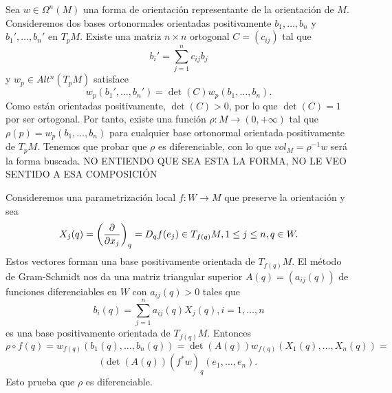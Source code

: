 \documentclass[CV.tex]{subfiles}
\begin{document}
\begin{dem}
Sea $w\in \Omega^n(M)$ una forma de orientación representante de la orientación de $M$. Consideremos dos bases ortonormales orientadas positivamente $b_1,\dots,b_n$ y $b_1',\dots,b_n'$ en $T_pM$. Existe una matriz $n\times n$ ortogonal $C=(c_{ij})$ tal que
\[
b_i'=\sum_{j=1}^n c_{ij}b_j
\]
y $w_p\in Alt^n(T_pM)$ satisface
\[
w_p(b_1',\dots,b_n')=\det(C)w_p(b_1,\dots,b_n).
\]
Como están orientadas positivamente, $\det(C)>0$, por lo que $\det(C)=1$ por ser ortogonal. Por tanto, existe una función $\rho:M\to (0,+\infty)$ tal que $\rho(p)=w_p(b_1,\dots,b_n)$ para cualquier base ortonormal orientada positivamente de $T_pM$. Tenemos que probar que $\rho$ es diferenciable, con lo que $vol_M=\rho^{-1}w$ será la forma buscada. NO ENTIENDO QUE SEA ESTA LA FORMA, NO LE VEO SENTIDO A ESA COMPOSICIÓN

Consideremos una parametrización local $f:W\to M$ que preserve la orientación y sea
\[
X_j(q)=\left(\frac{\partial }{\partial x_j}\right)_q=D_qf(e_j)\in T_{f(q)}M, 1\leq j\leq n, q\in W.
\]
Estos vectores forman una base positivamente orientada de $T_{f(q)}M$.
 El método de Gram-Schmidt nos da una matriz triangular superior $A(q)=(a_{ij}(q))$ de funciones diferenciables en $W$ con $a_{ij}(q)>0$ tales que
\[
b_i(q)=\sum_{j=1}^na_{ij}(q)X_j(q), i=1,\dots, n
\]
es una base positivamente orientada de $T_{f(q)}M$. Entonces
\[
\rho\circ f(q)=w_{f(q)}(b_1(q),\dots, b_n(q))=\det(A(q))w_{f(q)}(X_1(q),\dots, X_n(q))=
\]
\[
(\det(A(q))(f^*w)_q(e_1,\dots, e_n).
\]
Esto prueba que $\rho$ es diferenciable. 


\QED
\end{dem}
\end{document}
